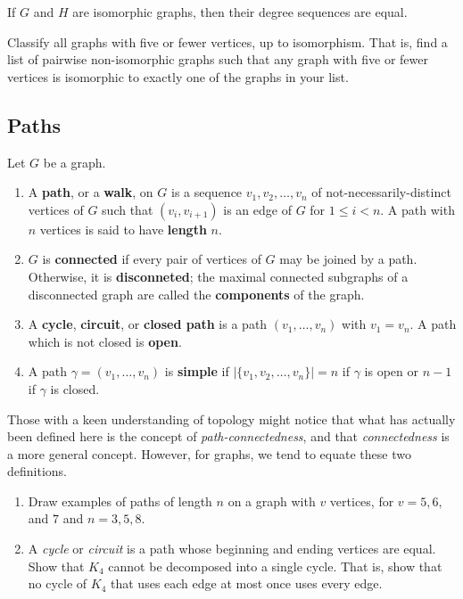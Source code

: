 \begin{theorem}\label{thm:degree_seq_invt} If $G$ and $H$ are isomorphic graphs, then their degree sequences are equal.
\end{theorem}

\begin{exercise} Classify all graphs with five or fewer vertices, up to isomorphism.  That is, find a list of pairwise non-isomorphic graphs such that any graph with five or fewer vertices is isomorphic to exactly one of the graphs in your list.
\end{exercise}

\subsection{Paths}\label{sec:paths}

\begin{definition} Let $G$ be a graph.
\begin{enumerate}
    \item A \textbf{path}, or a \textbf{walk}, on $G$ is a sequence $v_1, v_2, \ldots, v_n$ of not-necessarily-distinct vertices of $G$ such that $(v_i, v_{i+1})$ is an edge of $G$ for $1\leq i <n$.  A path with $n$ vertices is said to have \textbf{length} $n$.
    \item $G$ is \textbf{connected} if every pair of vertices of $G$ may be joined by a path.  Otherwise, it is \textbf{disconneted}; the maximal connected subgraphs of a disconnected graph are called the \textbf{components} of the graph.
    \item A \textbf{cycle}, \textbf{circuit}, or \textbf{closed path} is a path $(v_1, \ldots, v_n)$ with $v_1 = v_n$. A path which is not closed is \textbf{open}.
    \item A path $\gamma = (v_1, \ldots, v_n)$ is \textbf{simple} if $|\{v_1, v_2, \ldots, v_n\}| = n$ if $\gamma$ is open or $n-1$ if $\gamma$ is closed.
\end{enumerate}
\end{definition}

\begin{remark} Those with a keen understanding of topology might notice that what has actually been defined here is the concept of \textit{path-connectedness}, and that \textit{connectedness} is a more general concept.  However, for graphs, we tend to equate these two definitions.
\end{remark}

\begin{examples} \leavevmode
\begin{enumerate}
    \item Draw examples of paths of length $n$ on a graph with $v$ vertices, for $v=5, 6,$ and $7$ and $n = 3, 5, 8$.
    \item A \textit{cycle} or \textit{circuit} is a path whose beginning and ending vertices are equal.  Show that $K_4$ cannot be decomposed into a single cycle.  That is, show that no cycle of $K_4$ that uses each edge at most once uses every edge.
\end{enumerate}
\end{examples}

